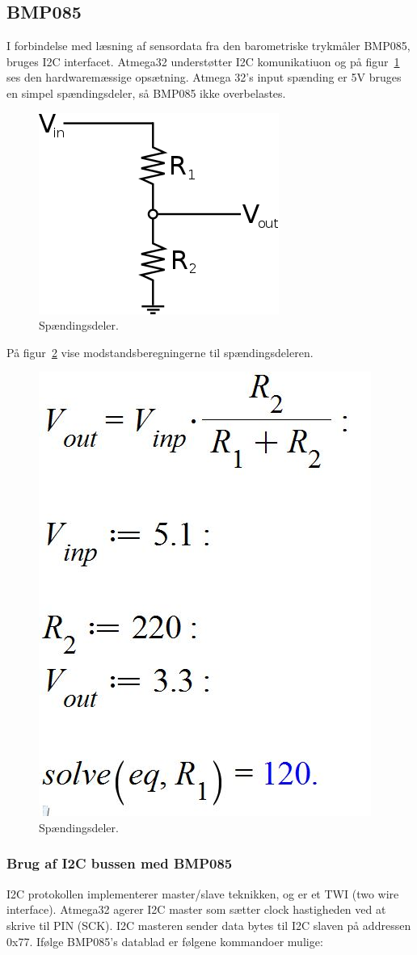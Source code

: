 \subsection{BMP085}

I forbindelse med læsning af sensordata fra den barometriske trykmåler BMP085, bruges I2C interfacet. Atmega32 understøtter I2C komunikatiuon og på figur~\ref{fig:voltagedivider} ses den hardwaremæssige opsætning. Atmega 32’s input spænding er 5V bruges en simpel spændingsdeler, så BMP085 ikke overbelastes.

\begin{figure}[h]
	\centering
	\includegraphics[width=0.3\linewidth]{figs/voltage_divider}
	\caption{Spændingsdeler.}
	\label{fig:voltagedivider}
\end{figure}

På figur~\ref{fig:voltagediv} vise modstandsberegningerne til spændingsdeleren.

\begin{figure}[h]
	\centering
	\includegraphics[width=0.3\linewidth]{figs/voltage_div}
	\caption{Spændingsdeler.}
	\label{fig:voltagediv}
\end{figure}

\subsubsection{Brug af I2C bussen med BMP085}

I2C protokollen implementerer master/slave teknikken, og er et TWI (two wire interface). 
Atmega32 agerer I2C master som sætter clock hastigheden ved at skrive til PIN (SCK). I2C masteren sender data bytes til I2C slaven på addressen 0x77.
Ifølge BMP085’s datablad er følgene kommandoer mulige:

